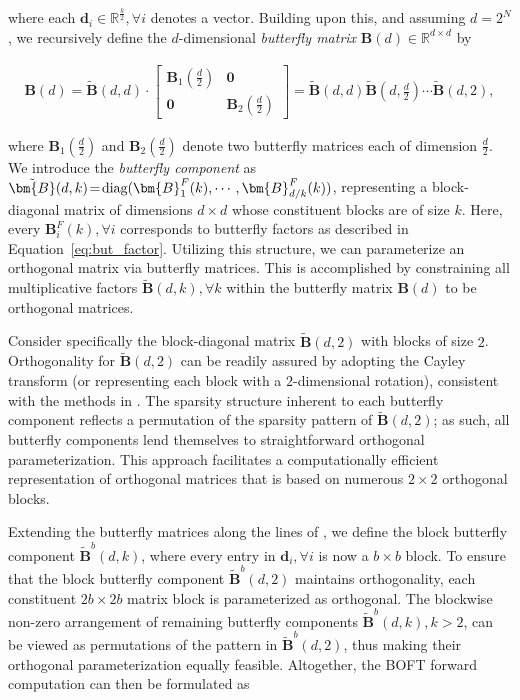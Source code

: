 where each $\bm{d}_i\in\mathbb{R}^{\frac{k}{2}},\forall i$ denotes a vector. Building upon this, and assuming $d=2^N$, we recursively define the $d$-dimensional \emph{butterfly matrix} $\bm{B}(d)\in\mathbb{R}^{d\times d}$ by

\begin{equation}
\begin{aligned}
    \!\!\bm{B}(d)=\tilde{\bm{B}}(d,d)\!\cdot\!\begin{bmatrix}
    \bm{B}_1(\frac{d}{2})\!\!\!\!\! & \bm{0} \\
    \bm{0}\!\!\!\!\! &\bm{B}_2(\frac{d}{2})
    \end{bmatrix}= \tilde{\bm{B}}(d,d)\tilde{\bm{B}}(d,\frac{d}{2})\cdots\tilde{\bm{B}}(d,2),
\end{aligned}
\end{equation}

where $\bm{B}_1(\frac{d}{2})$ and $\bm{B}_2(\frac{d}{2})$ denote two butterfly matrices each of dimension $\frac{d}{2}$. We introduce the \emph{butterfly component} as $\thickmuskip=2mu \medmuskip=2mu \tilde{\bm{B}}(d,k)=\text{diag}(\bm{B}^F_1(k),\cdots,\bm{B}^F_{d/k}(k))$, representing a block-diagonal matrix of dimensions $d\times d$ whose constituent blocks are of size $k$. Here, every $\bm{B}^F_i(k),\forall i$ corresponds to butterfly factors as described in Equation~\ref{eq:but_factor}. Utilizing this structure, we can parameterize an orthogonal matrix via butterfly matrices. This is accomplished by constraining all multiplicative factors $\tilde{\bm{B}}(d,k),\forall k$ within the butterfly matrix $\bm{B}(d)$ to be orthogonal matrices. 

Consider specifically the block-diagonal matrix $\tilde{\bm{B}}(d,2)$ with blocks of size $2$. Orthogonality for $\tilde{\bm{B}}(d,2)$ can be readily assured by adopting the Cayley transform (or representing each block with a $2$-dimensional rotation), consistent with the methods in \cite{liu2021orthogonal,qiu2023controlling}. The sparsity structure inherent to each butterfly component reflects a permutation of the sparsity pattern of $\tilde{\bm{B}}(d,2)$; as such, all butterfly components lend themselves to straightforward orthogonal parameterization. This approach facilitates a computationally efficient representation of orthogonal matrices that is based on numerous $2\times 2$ orthogonal blocks. 

Extending the butterfly matrices along the lines of \cite{chen2022pixelated}, we define the block butterfly component $\tilde{\bm{B}}^b(d,k)$, where every entry in $\bm{d}_i,\forall i$ is now a $b\times b$ block. To ensure that the block butterfly component $\tilde{\bm{B}}^b(d,2)$ maintains orthogonality, each constituent $2b\times 2b$ matrix block is parameterized as orthogonal. The blockwise non-zero arrangement of remaining butterfly components $\tilde{\bm{B}}^b(d,k), k>2$, can be viewed as permutations of the pattern in $\tilde{\bm{B}}^b(d,2)$, thus making their orthogonal parameterization equally feasible. Altogether, the BOFT forward computation can then be formulated as

